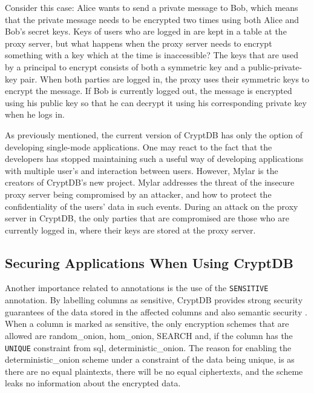 Consider this case: Alice wants to send a private message to Bob, which means that the private message needs to be encrypted two times using both Alice and Bob's secret keys. Keys of users who are logged in are kept in a table at the proxy server, but what happens when the proxy server needs to encrypt something with a key which at the time is inaccessible? The keys that are used by a principal to encrypt consists of both a symmetric key and a public-private-key pair. When both parties are logged in, the proxy uses their symmetric keys to encrypt the message. If Bob is currently logged out, the message is encrypted using his public key so that he can decrypt it using his corresponding private key when he logs in.

As previously mentioned, the current version of CryptDB has only the option of developing single-mode applications. One may react to the fact that the developers has stopped maintaining such a useful way of developing applications with multiple user's and interaction between users. However, Mylar \cite{mylar_homepage} is the creators of CryptDB's new project. Mylar addresses the threat of the insecure proxy server being compromised by an attacker, and how to protect the confidentiality of the users' data in such events. During an attack on the proxy server in CryptDB, the only parties that are compromised are those who are currently logged in, where their keys are stored at the proxy server.


\subsection{Securing Applications When Using CryptDB}
\label{sec:sensitive}

Another importance related to annotations is the use of the \verb!SENSITIVE! annotation. By labelling columns as sensitive, CryptDB provides strong security guarantees of the data stored in the affected columns and also semantic security \cite{popa_thesis}. When a column is marked as sensitive, the only encryption schemes that are allowed are \gls{random_onion}, \gls{hom_onion}, SEARCH and, if the column has the \verb!UNIQUE! constraint from \gls{sql}, \gls{deterministic_onion}. The reason for enabling the \gls{deterministic_onion} scheme under a constraint of the data being unique, is as there are no equal plaintexts, there will be no equal ciphertexts, and the scheme leaks no information about the encrypted data.




